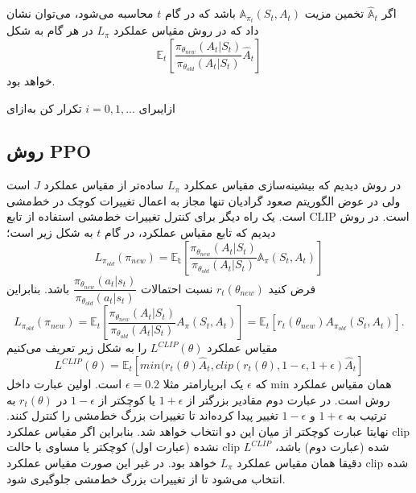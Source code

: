 اگر $\hat{\mathbb{A}}_t$ تخمین مزیت 
$\mathbb{A}_{\pi_t}(S_t, A_t)$
باشد که در گام $t$ محاسبه می‌شود، می‌توان نشان داد که در روش
مقیاس عملکرد $L_\pi$ در هر گام به شکل
$$\mathbb{E}_t\left[\dfrac{\pi_{\theta_{new}}(A_t| S_t)}{\pi_{\theta_{old}}(A_t|S_t)} \hat{A}_t \right]$$خواهد بود.


‌ازای{برای 
	$i=0,1,...$
	تکرار کن}
‌به‌ازای

\subsection{روش PPO}
در روش  دیدیم که بیشینه‌سازی مقیاس عمکلرد $L_\pi$ ساده‌تر از مقیاس عملکرد $J$ است ولی در عوض الگوریتم صعود گرادیان تنها مجاز به اعمال تغییرات کوچک در خط‌مشی است. یک راه دیگر برای کنترل تغییرات خط‌مشی استفاده از تابع CLIP است. در روش
دیدیم که تابع مقیاس عملکرد، در گام $t$ به شکل زیر است؛
$$L_{\pi_{old}}(\pi_{new}) = \mathbb{E_t}\left[\dfrac{\pi_{\theta_{new}}(A_t| S_t)}{\pi_{\theta_{old}}(A_t|S_t)} \mathbb{A}_{\pi}(S_t, A_t)\right]$$
فرض کنید 
$r_t(\theta_{new})$
نسبت احتمالات 
$\dfrac{\pi_{\theta_{new}}(a_t|s_t)}{\pi_{\theta_{old}}(a_t|s_t)}$ باشد. بنابراین
$$L_{\pi_{old}}(\pi_{new}) = \mathbb{E}_t\left[\dfrac{\pi_{\theta_{new}}(A_t| S_t)}{\pi_{\theta_{old}}(A_t|S_t)} A_{\pi}(S_t, A_t)\right] = \mathbb{E}_t\left[r_t(\theta_{new}) A_{\pi_{old}}(S_t,A_t)\right].$$ مقیاس عملکرد  $L^{CLIP}(\theta)$ را به شکل زیر تعریف می‌کنیم
$$L^{CLIP}(\theta) = \mathbb{E}_t\left[min(r_t(\theta) \hat{A}_t, clip(r_t(\theta), 1-\epsilon, 1+\epsilon) \hat{A}_t \right]$$
که $\epsilon$ یک ابرپارامتر مثلا 
$\epsilon=0.2$
است. اولین عبارت داخل min همان مقیاس عملکرد روش  است. در عبارت دوم مقادیر بزرگتر از $1+\epsilon$ یا کوچکتر از 
$1-\epsilon$
در $r_t(\theta)$ به ترتیب به $1+\epsilon$ و $1-\epsilon$ تغییر پیدا کرده‌اند تا تغییرات بزرگ خط‌مشی را کنترل کنند. نهایتا عبارت کوچکتر از میان این دو انتخاب خواهد شد. بنابراین اگر مقیاس عملکرد clip نشده (عبارت اول) کوچکتر یا مساوی با حالت clip شده (عبارت دوم) باشد، $L^{CLIP}$ دقیقا همان مقیاس عملکرد $L_\pi$ خواهد بود. در غیر این صورت مقیاس عملکرد clip شده انتخاب می‌شود تا از تغییرات بزرگ خط‌مشی جلوگیری شود.

